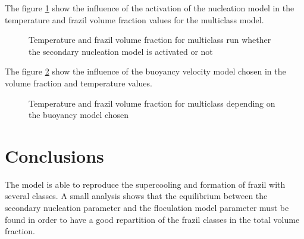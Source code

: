 The figure \ref{fig:nuc_model_fra} show the influence of the activation of the nucleation model in the temperature and frazil volume fraction values for the multiclass model.
\begin{figure}[H]
    \begin{center}
    \end{center}
    \caption{Temperature and frazil volume fraction for multiclass run whether the secondary nucleation model is activated or not}
    \label{fig:nuc_model_fra}
\end{figure}

The figure \ref{fig:buo_fra} show the influence of the buoyancy velocity model chosen in the volume fraction and temperature values.
\begin{figure}[H]
    \begin{center}
    \end{center}
    \caption{Temperature and frazil volume fraction for multiclass depending on the buoyancy model chosen}
    \label{fig:buo_fra}
\end{figure}

\section{Conclusions}

The model is able to reproduce the supercooling and formation of frazil with several classes. 
A small analysis shows that the equilibrium between the secondary nucleation parameter and the
floculation model parameter must be found in order to have a good repartition of the frazil classes in the total volume fraction.

\renewcommand{\labelitemi}{\textbullet}
